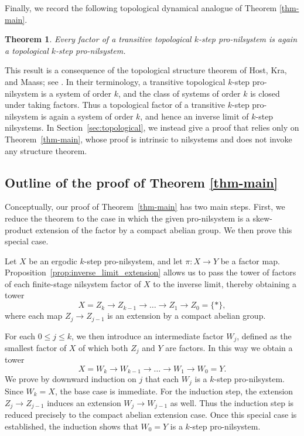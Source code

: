 \documentclass[12pt]{amsart}
\theoremstyle{plain}
\newtheorem{theorem}{Theorem}[section]
\theoremstyle{definition}
\begin{document}
Finally, we record the following topological dynamical analogue of Theorem \ref{thm-main}.

\begin{theorem} \label{thrm:topological_version_main_thrm}
    Every factor of a transitive topological $k$-step pro-nilsystem is again a topological $k$-step pro-nilsystem. 
\end{theorem}

This result is a consequence of the topological structure theorem of Host,
Kra, and Maass; see \cite[Theorem~1.2]{host2010nilsequences}. In their
terminology, a transitive topological \(k\)-step pro-nilsystem is a system of
order \(k\), and the class of systems of order \(k\) is closed under taking
factors. Thus a topological factor of a transitive \(k\)-step pro-nilsystem is
again a system of order \(k\), and hence an inverse limit of \(k\)-step
nilsystems. In Section~\ref{sec:topological}, we instead give a proof that relies only on
Theorem~\ref{thm-main}, whose proof is intrinsic to nilsystems and does not
invoke any structure theorem.

\subsection{Outline of the proof of Theorem \ref{thm-main}}\label{sec:proof}

Conceptually, our proof of Theorem~\ref{thm-main} has two main steps. First, we reduce the theorem to the case in which the given pro-nilsystem is a skew-product extension of the factor by a compact abelian group. We then prove this special case.

Let $X$ be an ergodic $k$-step pro-nilsystem, and let $\pi\colon X \to Y$ be a factor map. Proposition~\ref{prop:inverse_limit_extension} allows us to pass the tower of factors of each finite-stage nilsystem factor of $X$ to the inverse limit, thereby obtaining a tower
\[
X = Z_k \to Z_{k-1} \to \dots \to Z_1 \to Z_0 = \{*\},
\]
where each map $Z_j \to Z_{j-1}$ is an extension by a compact abelian group.

For each $0 \leq j \leq k$, we then introduce an intermediate factor $W_j$, defined as the smallest factor of $X$ of which both $Z_j$ and $Y$ are factors. In this way we obtain a tower
\[
X = W_k \to W_{k-1} \to \dots \to W_1 \to W_0 = Y.
\]
We prove by downward induction on $j$ that each $W_j$ is a $k$-step pro-nilsystem. Since $W_k = X$, the base case is immediate. For the induction step, the extension $Z_j \to Z_{j-1}$ induces an extension $W_j \to W_{j-1}$ as well. Thus the induction step is reduced precisely to the compact abelian extension case. Once this special case is established, the induction shows that $W_0 = Y$ is a $k$-step pro-nilsystem.
\end{document}
